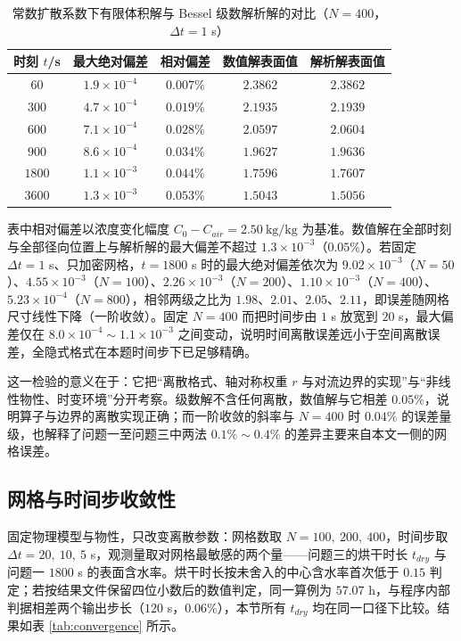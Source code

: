 \documentclass[12pt,a4paper]{article}
\begin{document}
\begin{center}
\begin{table}[H]
\centering
\caption{常数扩散系数下有限体积解与 Bessel 级数解析解的对比（$N=400$，$\Delta t=1$ s）}
\label{tab:analytic}
\begin{tabular}{ccccc}
\toprule
时刻 $t$/s & 最大绝对偏差 & 相对偏差 & 数值解表面值 & 解析解表面值\\
\midrule
$60$   & $1.9\times10^{-4}$ & $0.007\%$ & $2.3862$ & $2.3862$\\
$300$  & $4.7\times10^{-4}$ & $0.019\%$ & $2.1935$ & $2.1939$\\
$600$  & $7.1\times10^{-4}$ & $0.028\%$ & $2.0597$ & $2.0604$\\
$900$  & $8.6\times10^{-4}$ & $0.034\%$ & $1.9627$ & $1.9636$\\
$1800$ & $1.1\times10^{-3}$ & $0.044\%$ & $1.7596$ & $1.7607$\\
$3600$ & $1.3\times10^{-3}$ & $0.053\%$ & $1.5043$ & $1.5056$\\
\bottomrule
\end{tabular}
\end{table}

表中相对偏差以浓度变化幅度 $C_0-C_{air}=2.50\ \mathrm{kg/kg}$ 为基准。数值解在全部时刻与全部径向位置上与解析解的最大偏差不超过 $1.3\times10^{-3}$（$0.05\%$）。若固定 $\Delta t=1$ s、只加密网格，$t=1800$ s 时的最大绝对偏差依次为 $9.02\times10^{-3}$（$N=50$）、$4.55\times10^{-3}$（$N=100$）、$2.26\times10^{-3}$（$N=200$）、$1.10\times10^{-3}$（$N=400$）、$5.23\times10^{-4}$（$N=800$），相邻两级之比为 $1.98$、$2.01$、$2.05$、$2.11$，即误差随网格尺寸线性下降（一阶收敛）。固定 $N=400$ 而把时间步由 $1$ s 放宽到 $20$ s，最大偏差仅在 $8.0\times10^{-4}\sim1.1\times10^{-3}$ 之间变动，说明时间离散误差远小于空间离散误差，全隐式格式在本题时间步下已足够精确。

这一检验的意义在于：它把“离散格式、轴对称权重 $r$ 与对流边界的实现”与“非线性物性、时变环境”分开考察。级数解不含任何离散，数值解与它相差 $0.05\%$，说明算子与边界的离散实现正确；而一阶收敛的斜率与 $N=400$ 时 $0.04\%$ 的误差量级，也解释了问题一至问题三中两法 $0.1\%\sim0.4\%$ 的差异主要来自本文一侧的网格误差。

\subsection{网格与时间步收敛性}

固定物理模型与物性，只改变离散参数：网格数取 $N=100,\ 200,\ 400$，时间步取 $\Delta t=20,\ 10,\ 5$ s，观测量取对网格最敏感的两个量——问题三的烘干时长 $t_{dry}$ 与问题一 $1800$ s 的表面含水率。烘干时长按未舍入的中心含水率首次低于 $0.15$ 判定；若按结果文件保留四位小数后的数值判定，同一算例为 $57.07$ h，与程序内部判据相差两个输出步长（$120$ s，$0.06\%$），本节所有 $t_{dry}$ 均在同一口径下比较。结果如表 \ref{tab:convergence} 所示。


\end{center}
\end{document}

